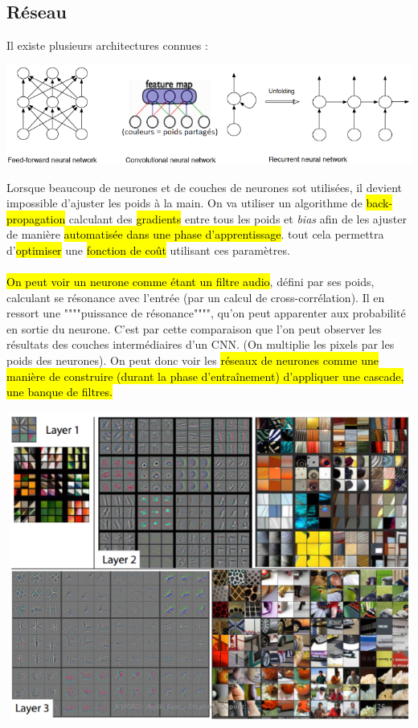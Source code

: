 \documentclass[letterpaper, 12pt]{article}
\newcommand{\alinea}{
\hspace*{0.5cm}}
\begin{document}
		\subsection{Réseau}
			\alinea Il existe plusieurs architectures connues : 
			\begin{center}
				\includegraphics[width=\textwidth]{Images/networks}
			\end{center}
			\alinea Lorsque beaucoup de neurones et de couches de neurones sot utilisées, il devient impossible d'ajuster les poids
				à la main. On va utiliser un algorithme de \hl{back-propagation} calculant des \hl{gradients} entre tous les poids
				et \textit{bias} afin de les ajuster de manière \hl{automatisée dans une phase d'apprentissage}. tout cela permettra
				 d'\hl{optimiser} une \hl{fonction de coût} utilisant ces paramètres.\\
			~\\
			\alinea \hl{On peut voir un neurone comme étant un filtre audio}, défini par ses poids, calculant se résonance avec  
				l'entrée (par un calcul de cross-corrélation). 
				Il en ressort une """"puissance de résonance"""", qu'on peut apparenter aux probabilité en sortie du neurone. 
				C'est par cette comparaison que l'on peut observer les résultats des couches intermédiaires d'un CNN.
				(On multiplie les pixels par les poids des neurones). On peut donc voir les \hl{réseaux de neurones comme une 
				manière de construire (durant la phase d'entraînement) d'appliquer une cascade, une banque de filtres.} \\
			\begin{minipage}{0.6\textwidth}
				\begin{center}
					\includegraphics[width=\textwidth]{Images/cnn}
				\end{center}
			\end{minipage} \hfill
\end{document}
